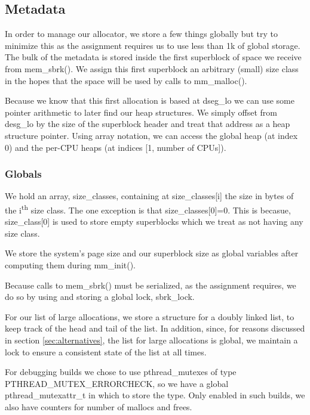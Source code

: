 \documentclass{article}
\begin{document}
\subsection{Metadata}
In order to manage our allocator, we store a few things globally but try to
minimize this as the assignment requires us to use less than 1k of global
storage. The bulk of the metadata is stored inside the first superblock
of space we receive from mem\_sbrk(). We assign this first superblock an
arbitrary (small) size class in the hopes that the space will be used by
calls to mm\_malloc().

Because we know that this first allocation is based at dseg\_lo we can use
some pointer arithmetic to later find our heap structures. We simply offset
from desg\_lo by the size of the superblock header and treat that address as
a heap structure pointer. Using array notation, we can access the global
heap (at index 0) and the per-CPU heaps (at indices [1, number of CPUs]).

\subsubsection{Globals}
We hold an array, size\_classes, containing at size\_classes[i] the size
in bytes of the i\textsuperscript{th} size class. The one exception is that 
size\_classes[0]=0. This is becasue, size\_class[0] is used to store empty 
superblocks which we treat as not having any size class.

We store the system's page size and our superblock size as global variables
after computing them during mm\_init().

Because calls to mem\_sbrk() must be serialized, as the assignment requires, 
we do so by using and storing a global lock, sbrk\_lock.

For our list of large allocations, we store a structure for a doubly linked 
list, to keep track of the head and tail of the list. In addition, since, for 
reasons discussed in section \ref{sec:alternatives}, the list for large
allocations is global, we maintain a lock to ensure a consistent state 
of the list at all times.

For debugging builds we chose to use pthread\_mutexes of type
PTHREAD\_MUTEX\_ERRORCHECK, so we have a global pthread\_mutexattr\_t in which
to store the type. Only enabled in such builds, we also have counters for
number of mallocs and frees.
\end{document}
